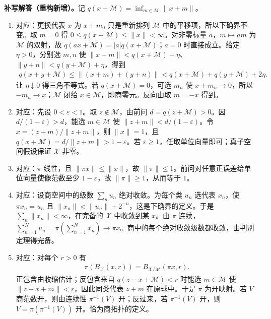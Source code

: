\documentclass[../../main.tex]{subfiles}
\begin{document}
\begin{solution}
\textbf{补写解答（重构新增）。}记 $q(x+\mathcal M)=\inf_{m\in\mathcal M}\|x+m\|$。
\begin{enumerate}
\item 对应：更换代表 $x$ 为 $x+m_0$ 只是重新排列 $\mathcal M$ 中的平移项，所以下确界不变。取 $m=0$ 得 $0\le q(x+\mathcal M)\le\|x\|<\infty$。对非零标量 $a$，$m\mapsto am$ 为 $\mathcal M$ 的双射，故 $q(ax+\mathcal M)=|a|q(x+\mathcal M)$；$a=0$ 时直接成立。给定 $\eta>0$，分别选 $m,n$ 使 $\|x+m\|<q(x+\mathcal M)+\eta$、$\|y+n\|<q(y+\mathcal M)+\eta$，得到
\begin{align*}
q(x+y+\mathcal M)\le\|(x+m)+(y+n)\|
<q(x+\mathcal M)+q(y+\mathcal M)+2\eta.
\end{align*}
让 $\eta\downarrow0$ 得三角不等式。若 $q(x+\mathcal M)=0$，可选 $m_n$ 使 $x+m_n\to0$，所以 $-m_n\to x$；$\mathcal M$ 闭给 $x\in\mathcal M$，即商零元。反向由取 $m=-x$ 得到。
\item 对应：先设 $0<\varepsilon<1$。取 $z\notin\mathcal M$，由前问 $d=q(z+\mathcal M)>0$。因 $d/(1-\varepsilon)>d$，能选 $m\in\mathcal M$ 使 $\|z+m\|<d/(1-\varepsilon)$。令 $x=(z+m)/\|z+m\|$，则 $\|x\|=1$，且 $q(x+\mathcal M)=d/\|z+m\|>1-\varepsilon$。若 $\varepsilon\ge1$，任取单位向量即可；真子空间假设保证 $\mathcal X$ 非零。
\item 对应：$\pi$ 线性，且 $\|\pi x\|\le\|x\|$，故 $\|\pi\|\le1$。前问对任意正误差给单位向量使像范数至少 $1-\varepsilon$，故 $\|\pi\|\ge1$，从而等于 $1$。
\item 对应：设商空间中的级数 $\sum_nu_n$ 绝对收敛。为每个类 $u_n$ 选代表 $x_n$，使 $\pi x_n=u_n$ 且 $\|x_n\|<\|u_n\|+2^{-n}$，这是下确界的定义。于是 $\sum_n\|x_n\|<\infty$，在完备的 $\mathcal X$ 中收敛到某 $x$。由 $\pi$ 连续，$\sum_{n=1}^Nu_n=\pi(\sum_{n=1}^Nx_n)\to\pi x$。商中的每个绝对收敛级数都收敛，由判别定理得完备。
\item 对应：对每个 $r>0$ 有
\begin{align*}
\pi(B_{\mathcal X}(x,r))=B_{\mathcal X/\mathcal M}(\pi x,r).
\end{align*}
正包含由收缩估计；反包含来自 $q(z-x+\mathcal M)<r$ 时能选 $m\in\mathcal M$ 使 $\|z-x+m\|<r$，因此同类代表 $z+m$ 在原球中。于是 $\pi$ 为开映射。若 $V$ 商范数开，则由连续性 $\pi^{-1}(V)$ 开；反过来，若 $\pi^{-1}(V)$ 开，则 $V=\pi(\pi^{-1}(V))$ 开。恰为商拓扑的定义。
\end{enumerate}
\end{solution}
\end{document}

